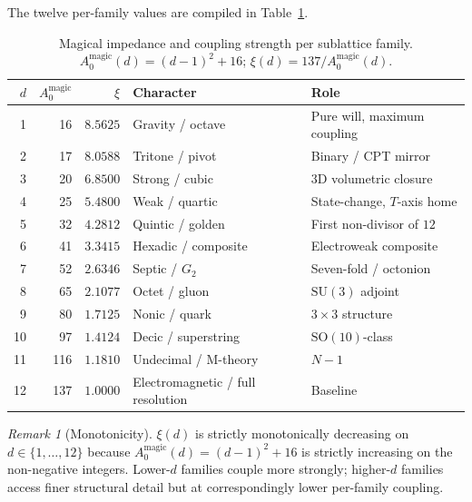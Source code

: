 \documentclass[11pt,a4paper]{article}
\theoremstyle{definition}
\theoremstyle{remark}
\newtheorem{remark}[theorem]{Remark}
\begin{document}
The twelve per-family values are compiled in Table~\ref{tab:impedance}.
\begin{table}[h]
\centering
\caption{Magical impedance and coupling strength per sublattice family. $A_{0}^{\text{magic}}(d) = (d-1)^{2} + 16$; $\xi(d) = 137/A_{0}^{\text{magic}}(d)$.}
\label{tab:impedance}
\begin{tabular}{@{}rrrll@{}}
\toprule
$d$ & $A_{0}^{\text{magic}}$ & $\xi$ & Character & Role \\
\midrule
 1 &  16 & $8.5625$ & Gravity / octave                & Pure will, maximum coupling \\
 2 &  17 & $8.0588$ & Tritone / pivot                 & Binary / CPT mirror \\
 3 &  20 & $6.8500$ & Strong / cubic                  & $3$D volumetric closure \\
 4 &  25 & $5.4800$ & Weak / quartic                  & State-change, $T$-axis home \\
 5 &  32 & $4.2812$ & Quintic / golden                & First non-divisor of $12$ \\
 6 &  41 & $3.3415$ & Hexadic / composite             & Electroweak composite \\
 7 &  52 & $2.6346$ & Septic / $G_{2}$                & Seven-fold / octonion \\
 8 &  65 & $2.1077$ & Octet / gluon                   & $\mathrm{SU}(3)$ adjoint \\
 9 &  80 & $1.7125$ & Nonic / quark                   & $3 \times 3$ structure \\
10 &  97 & $1.4124$ & Decic / superstring             & $\mathrm{SO}(10)$-class \\
11 & 116 & $1.1810$ & Undecimal / M-theory            & $N{-}1$ \\
12 & 137 & $1.0000$ & Electromagnetic / full resolution & Baseline \\
\bottomrule
\end{tabular}
\end{table}

\begin{remark}[Monotonicity]
$\xi(d)$ is strictly monotonically decreasing on $d\in\{1,\ldots,12\}$ because $A_{0}^{\text{magic}}(d) = (d-1)^{2}+16$ is strictly increasing on the non-negative integers. Lower-$d$ families couple more strongly; higher-$d$ families access finer structural detail but at correspondingly lower per-family coupling.
\end{remark}

\end{document}
